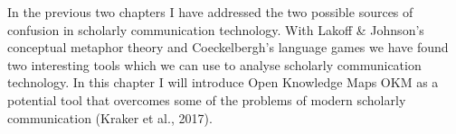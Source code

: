 In the previous two chapters I have addressed the two possible sources of confusion in scholarly communication technology. With Lakoff & Johnson’s conceptual metaphor theory and Coeckelbergh’s language games we have found two interesting tools which we can use to analyse scholarly communication technology. In this chapter I will introduce Open Knowledge Maps OKM as a potential tool that overcomes some of the problems of modern scholarly communication (Kraker et al., 2017).